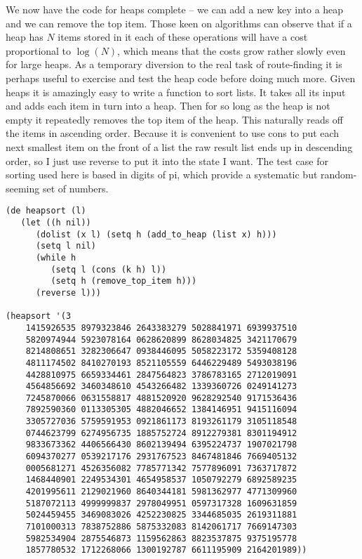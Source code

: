 We now have the code for heaps complete -- we can add a new key into a heap
and we can remove the top item. Those keen on algorithms can observe that
if a heap has $N$ items stored in it each of these operations will have a
cost proportional to $\log(N)$, which means that the costs grow rather
slowly even for large heaps. As a temporary diversion to the real task of
route-finding it is perhaps useful to exercise and test the heap code before
doing much more. Given heaps it is amazingly easy to write a function
to sort lists. It takes all its input and adds each item in turn into a heap.
Then for so long as the heap is not empty it repeatedly removes the
top item of the heap. This naturally reads off the items in ascending
order. Because it is convenient to use {\tx cons} to put each next smallest
item on the front of a list the raw result list ends up in descending
order, so I just use {\tx reverse} to put it into the state I want. The
test case for sorting used here is based in digits of pi, which provide
a systematic but random-seeming set of numbers.
{\small\begin{verbatim}
(de heapsort (l)
   (let ((h nil))
      (dolist (x l) (setq h (add_to_heap (list x) h)))
      (setq l nil)
      (while h
         (setq l (cons (k h) l))
         (setq h (remove_top_item h)))
      (reverse l)))

(heapsort '(3
    1415926535 8979323846 2643383279 5028841971 6939937510
    5820974944 5923078164 0628620899 8628034825 3421170679
    8214808651 3282306647 0938446095 5058223172 5359408128
    4811174502 8410270193 8521105559 6446229489 5493038196
    4428810975 6659334461 2847564823 3786783165 2712019091
    4564856692 3460348610 4543266482 1339360726 0249141273
    7245870066 0631558817 4881520920 9628292540 9171536436
    7892590360 0113305305 4882046652 1384146951 9415116094
    3305727036 5759591953 0921861173 8193261179 3105118548
    0744623799 6274956735 1885752724 8912279381 8301194912
    9833673362 4406566430 8602139494 6395224737 1907021798
    6094370277 0539217176 2931767523 8467481846 7669405132
    0005681271 4526356082 7785771342 7577896091 7363717872
    1468440901 2249534301 4654958537 1050792279 6892589235
    4201995611 2129021960 8640344181 5981362977 4771309960
    5187072113 4999999837 2978049951 0597317328 1609631859
    5024459455 3469083026 4252230825 3344685035 2619311881
    7101000313 7838752886 5875332083 8142061717 7669147303
    5982534904 2875546873 1159562863 8823537875 9375195778
    1857780532 1712268066 1300192787 6611195909 2164201989))
\end{verbatim}}

